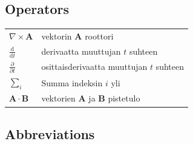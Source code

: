 \documentclass[english,12pt,a4paper,pdftex,elec,utf8]{aaltothesis}
\begin{document}
\subsection*{Operators}

\begin{tabular}{ll}
$\nabla \times \mathbf{A}$              & vektorin $\mathbf{A}$ roottori\\
$\displaystyle\frac{\mbox{d}}{\mbox{d} t}$ & derivaatta muuttujan $t$ suhteen\\
[3mm]
$\displaystyle\frac{\partial}{\partial t}$  & osittaisderivaatta muuttujan $t$ suhteen \\[3mm]
$\sum_i $                       & Summa indeksin $i$ yli\\
$\mathbf{A} \cdot \mathbf{B}$    & vektorien $\mathbf{A}$ ja $\mathbf{B}$ pistetulo
\end{tabular}

\subsection*{Abbreviations}
\end{document}
